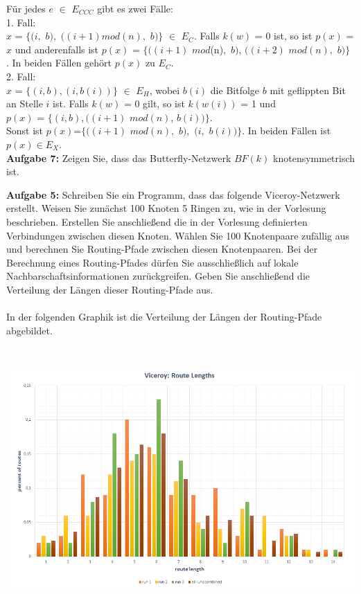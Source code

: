\documentclass[12pt,a4paper]{report}
\begin{document}
Für jedes $e$ $\in$ $E_{CCC}$ gibt es zwei Fälle:\\
1. Fall:\\
$x$ = $\{(i,$ $b),$ $((i + 1)mod(n),$ $b)\}$ $\in$ $E_{C}$. Falls $k(w)$ = 0 ist, so ist $p(x)$ = $x$ und anderenfalls ist 
$p(x)$ = $\{((i + 1)$ $mod$(n)$,$ $b)$, $((i + 2)$ $mod(n),$ $b)\}$ . In beiden Fällen gehört $p(x)$ zu $E_{C}$.\\
2. Fall: \\
$x$ = $\{(i, b), (i, b(i))\}$ $\in$ $E_H$, wobei $b(i)$ die Bitfolge $b$ mit geflippten Bit an Stelle $i$ ist. Falls $k(w)$ = 0 gilt, so ist $k(w(i))$ = 1 und \\
$p(x)$ = $\{(i, b), ((i + 1)$ $mod(n)$, $b(i))\}$. \\
Sonst ist $p(x)$=$\{((i + 1)$ $mod(n),$ $b),$ $(i,$ $b(i))\}$. In beiden Fällen ist $p(x)\in E_X$. \\
\newpage
\textbf{Aufgabe 7:}
Zeigen Sie, dass das Butterfly-Netzwerk $BF(k)$ knotensymmetrisch ist.
\\
\begin{figure}[!hb]
	
\end{figure}


\textbf{Aufgabe 5:}
Schreiben Sie ein Programm, dass das folgende Viceroy-Netzwerk
erstellt. Weisen Sie zunächst 100 Knoten 5 Ringen zu, wie in der Vorlesung
beschrieben. Erstellen Sie anschließend die in der Vorlesung definierten
Verbindungen zwischen diesen Knoten. Wählen Sie 100 Knotenpaare
zufällig aus und berechnen Sie Routing-Pfade zwischen diesen Knotenpaaren.
Bei der Berechnung eines Routing-Pfades dürfen Sie ausschließlich auf
lokale Nachbarschaftsinformationen zurückgreifen. Geben Sie anschließend
die Verteilung der Längen dieser Routing-Pfade aus.
\\
\\
In der folgenden Graphik ist die Verteilung der Längen der Routing-Pfade abgebildet.
\begin{center}
	\includegraphics[height=10cm, width=15cm]{auswertung.png}
\end{center}
\end{document}
